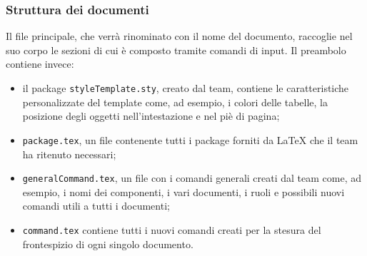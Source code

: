 \subsubsection{Struttura dei documenti}
Il file principale, che verrà rinominato con il nome del documento, raccoglie nel suo corpo le sezioni di cui è composto tramite comandi di input. Il preambolo contiene invece:
\begin{itemize}
	\item il package \texttt{styleTemplate.sty}, creato dal team, contiene le caratteristiche personalizzate del template come, ad esempio, i colori delle tabelle, la posizione degli oggetti nell'intestazione e nel piè di pagina;
	\item \texttt{package.tex}, un file contenente tutti i package forniti da \LaTeX{} che il team ha ritenuto necessari;
	\item \texttt{generalCommand.tex}, un file con i comandi generali creati dal team come, ad esempio, i nomi dei componenti, i vari documenti, i ruoli e possibili nuovi comandi utili a tutti i documenti;
	\item \texttt{command.tex} contiene tutti i nuovi comandi creati per la stesura del frontespizio di ogni singolo documento.
\end{itemize}


